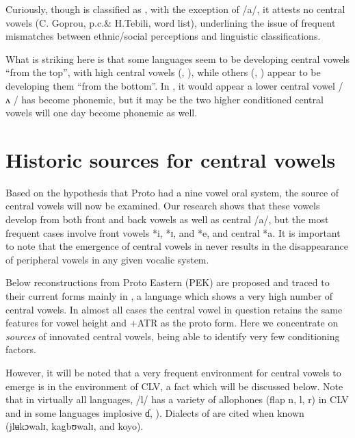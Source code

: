 \documentclass[output=paper
,newtxmath
,modfonts
,nonflat]{langsci/langscibook}
\begin{document}
Curiously, though  is classified as , with the exception of /a/, it attests no central vowels (C. Goprou, p.c.\& H.Tebili, word list), underlining the issue of frequent mismatches between ethnic/social perceptions and linguistic classifications. 

What is striking here is that some languages seem to be developing central vowels “from the top”, with high central vowels (,  ), while others (, ) appear to be developing them “from the bottom”.  In , it would appear a lower central vowel / ʌ / has become phonemic, but it may be the two higher conditioned central vowels will one day become phonemic as well. 

\section{Historic sources for central vowels}\label{sec:zogbo:3}

Based on the hypothesis that Proto  had a nine vowel oral system, the source of central vowels will now be examined.  Our research shows that these vowels develop from both front and back vowels as well as central /a/, but the most frequent cases involve front vowels *i, *ɪ, and *e, and central *a.  It is important to note that the emergence of central vowels in  never results in the disappearance of peripheral vowels in any given vocalic system.  

Below reconstructions from Proto Eastern  (PEK) are proposed and traced to their current forms mainly in , a language which shows a very high number of central vowels.  In almost all cases the central vowel in question retains the same features for vowel height and +ATR as the proto form.  Here we concentrate on \textit{sources} of innovated central vowels, being able to identify very few conditioning factors. 

However, it will be noted that a very frequent environment for central vowels to emerge is in the environment of CLV, a fact which will be discussed below.  Note that in virtually all  languages, /l/ has a variety of allophones (flap n, l, r) in CLV and in some languages implosive ɗ, \citealt{Marchese1979/1983}). Dialects of  are cited when known (jlʉkɔwalɪ, kagbʊwalɪ, and koyo).
\end{document}
